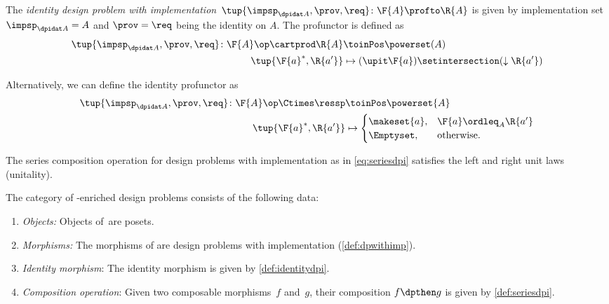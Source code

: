 {    \begin{definition}
        \label{def:identitydpi}
        The \emph{identity design problem with implementation}~$\tup{\impsp_{\dpidat A},\prov,\req} \colon \F{A} \profto \R{A}$ is given by implementation set $\impsp_{\dpidat A} = A$ and $\prov=\req$ being the identity on $A$.
        The profunctor is defined as
        \begin{align}
            \tup{\impsp_{\dpidat A},\prov,\req} \colon \F{A}\op \cartprod \R{A} & \toinPos \powerset(A) \\
            \tup{\F{a}^*,\R{a'}}                                                & \mapsto (\upit \F{a}) \setintersection (\downarrow \R{a'})
        \end{align}
    \end{definition}
    \begin{remark}
        Alternatively, we can define the identity profunctor as
        \begin{align}
            \tup{\impsp_{\dpidat A},\prov,\req}\colon \F{A}\op \Ctimes \ressp & \toinPos \powerset{A} \\
            \tup{\F{a}^*,\R{a'}}                                              & \mapsto
            \begin{cases}
                \makeset{a}, & \F{a}\ordleq_A \R{a'} \\
                \Emptyset,   & \text{otherwise}.
            \end{cases}
        \end{align}
    \end{remark}

    \begin{lemma}\label{lem:dp-unital}
        The series composition operation for design problems with implementation as in \cref{eq:seriesdpi} satisfies the left and right unit laws (unitality).
    \end{lemma}


    \begin{definition}
        \label{def:set-enriched-dp}
        The category of \Set-enriched design problems \DPI consists of the following data:
        \begin{enumerate}
            \item \emph{Objects:}
                  Objects of~\DPI are posets.
            \item \emph{Morphisms:}
                  The morphisms of \DPI are design problems with implementation (\cref{def:dpwithimp}).
            \item \emph{Identity morphism}: The identity morphism is given by \cref{def:identitydpi}.
            \item \emph{Composition operation}: Given two composable morphisms~$f$ and~$g$, their composition $f\dpthen g$ is given by \cref{def:seriesdpi}.
        \end{enumerate}
    \end{definition}

}
